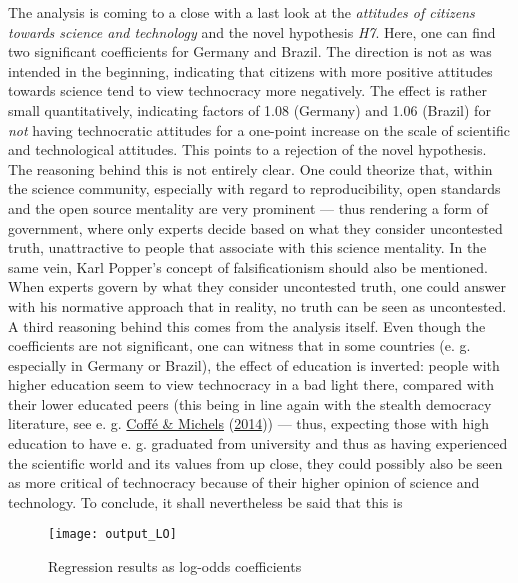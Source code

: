 \documentclass[
  12pt,
  english,
]{article}
\begin{document}
The analysis is coming to a close with a last look at the
\emph{attitudes of citizens towards science and technology} and the
novel hypothesis \emph{H7}. Here, one can find two significant
coefficients for Germany and Brazil. The direction is not as was
intended in the beginning, indicating that citizens with more positive
attitudes towards science tend to view technocracy more negatively. The
effect is rather small quantitatively, indicating factors of 1.08
(Germany) and 1.06 (Brazil) for \emph{not} having technocratic attitudes
for a one-point increase on the scale of scientific and technological
attitudes. This points to a rejection of the novel hypothesis. The
reasoning behind this is not entirely clear. One could theorize that,
within the science community, especially with regard to reproducibility,
open standards and the open source mentality are very prominent --- thus
rendering a form of government, where only experts decide based on what
they consider uncontested truth, unattractive to people that associate
with this science mentality. In the same vein, Karl Popper's concept of
falsificationism should also be mentioned. When experts govern by what
they consider uncontested truth, one could answer with his normative
approach that in reality, no truth can be seen as uncontested. A third
reasoning behind this comes from the analysis itself. Even though the
coefficients are not significant, one can witness that in some countries
(e. g. especially in Germany or Brazil), the effect of education is
inverted: people with higher education seem to view technocracy in a bad
light there, compared with their lower educated peers (this being in
line again with the stealth democracy literature, see e. g.
\protect\hyperlink{ref-coffe2014education}{Coffé \& Michels}
(\protect\hyperlink{ref-coffe2014education}{2014})) --- thus, expecting
those with high education to have e. g. graduated from university and
thus as having experienced the scientific world and its values from up
close, they could possibly also be seen as more critical of technocracy
because of their higher opinion of science and technology. To conclude,
it shall nevertheless be said that this is

\begin{figure}

{\centering \texttt{[image: output\_LO]} 

}

\caption{Regression results as log-odds coefficients}\label{fig:insert graphics: LO table}
\end{figure}
\end{document}
